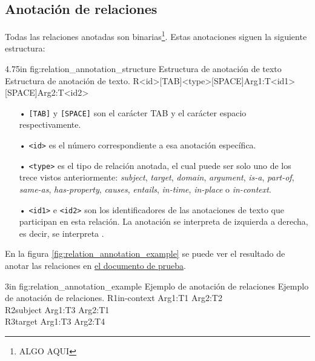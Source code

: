\subsection{Anotación de relaciones}
\label{section:relation_annotation}
Todas las relaciones anotadas son binarias\footnote{ALGO AQUI}. Estas anotaciones siguen la siguiente estructura:

\begin{annexample}
	[backgroundcolor=green!13]
	{4.75in}
	{fig:relation_annotation_structure}
	{Estructura de anotación de texto}
	{Estructura de anotación de texto.}
	R<id>[TAB]<type>[SPACE]Arg1:T<id1>[SPACE]Arg2:T<id2>
\end{annexample}

\begin{itemize}
	\item[•] \texttt{[TAB]} y \texttt{[SPACE]} son el carácter TAB y el carácter espacio respectivamente.
	\vspace{-0.1in}
	\item[•] \texttt{<id>} es el número correspondiente a esa anotación específica.
	\vspace{-0.1in}
	\item[•] \texttt{<type>} es el tipo de relación anotada, el cual puede ser solo uno de los trece vistos anteriormente: {\it subject}, {\it target}, {\it domain}, {\it argument}, {\it is-a}, {\it part-of}, {\it same-as}, {\it has-property}, {\it causes}, {\it entails}, {\it in-time}, {\it in-place} o {\it in-context}.
	\vspace{-0.1in}
	\item[•] \texttt{<id1>} e \texttt{<id2>} son los identificadores de las anotaciones de texto que participan en esta relación. La anotación se interpreta de izquierda a derecha, es decir, se interpreta .
\end{itemize}

En la figura \ref{fig:relation_annotation_example} se puede ver el resultado de anotar las relaciones en \hyperref[sentence:annotation_example]{el documento de prueba}.

\begin{annexample}
	[backgroundcolor=cyan!13]
	{3in}
	{fig:relation_annotation_example}
	{Ejemplo de anotación de relaciones}
	{Ejemplo de anotación de relaciones.}
	R1\space\space in-context Arg1:T1 Arg2:T2\\
	R2\space\space subject Arg1:T3 Arg2:T1\\
	R3\space\space target Arg1:T3 Arg2:T4
\end{annexample}

